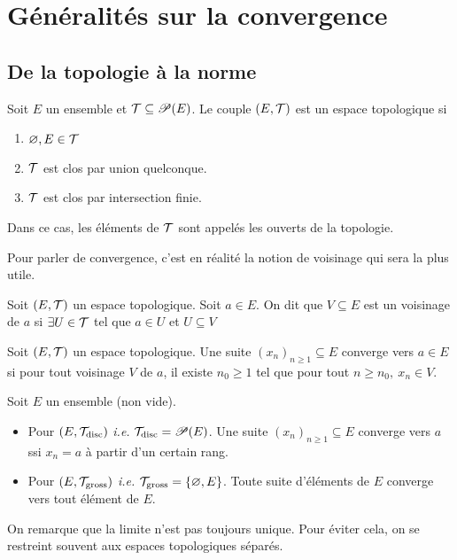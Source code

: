 \chapter{Généralités sur la convergence}
\section{De la topologie à la norme}
\begin{definition}
    Soit $E$ un ensemble et $\mathcal{T}\subseteq \mathscr{P}(E)$. Le couple $(E,\mathcal{T})$ est un espace topologique si 
    \begin{enumerate}
        \item $\varnothing,E\in \mathcal{T}$
        \item $\mathcal{T}$ est clos par union quelconque.
        \item $\mathcal{T}$ est clos par intersection finie.
    \end{enumerate}
    Dans ce cas, les éléments de $\mathcal{T}$ sont appelés les ouverts de la topologie.
\end{definition}
Pour parler de convergence, c'est en réalité la notion de voisinage qui sera la plus utile.
\begin{definition}
    Soit $(E,\mathcal{T})$ un espace topologique. Soit $a\in E$. On dit que $V\subseteq E$ est un voisinage de $a$ si $\exists U\in\mathcal{T}$ tel que $a\in U$ et $U\subseteq V$
\end{definition}
\begin{definition}
    Soit $(E,\mathcal{T})$ un espace topologique. Une suite $(x_n)_{n\ge 1}\subseteq E$ converge vers $a\in E$ si pour tout voisinage $V$ de $a$, il existe $n_0\ge 1$ tel que pour tout $n\ge n_0,\ x_n\in V$. 
\end{definition}
\begin{exemple}
    Soit $E$ un ensemble (non vide).
    \begin{itemize}
        \item Pour $(E,\mathcal{T}_{\text{disc}})$ \textit{i.e.} $\mathcal{T}_{\text{disc}} = \mathscr{P}(E)$. Une suite $(x_n)_{n\ge 1}\subseteq E$ converge vers $a$ ssi $x_n = a$ à partir d'un certain rang.
        \item Pour $(E,\mathcal{T}_{\text{gross}})$ \textit{i.e.} $\mathcal{T}_{\text{gross}} = \{\varnothing, E\}$. Toute suite d'éléments de $E$ converge vers tout élément de $E$.
    \end{itemize}
\end{exemple}
On remarque que la limite n'est pas toujours unique. Pour éviter cela, on se restreint souvent aux espaces topologiques séparés.
